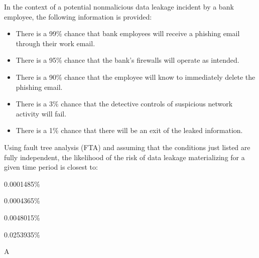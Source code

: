 \documentclass{article}
\newcounter{question} %
\begin{document}
\begin{question}
    In the context of a potential nonmalicious data leakage incident by a bank employee, the following information is provided:
    \begin{itemize}
        \item There is a 99\% chance that bank employees will receive a phishing email through their work email.
        \item There is a 95\% chance that the bank's firewalls will operate as intended.
        \item There is a 90\% chance that the employee will know to immediately delete the phishing email.
        \item There is a 3\% chance that the detective controls of suspicious network activity will fail.
        \item There is a 1\% chance that there will be an exit of the leaked information.
    \end{itemize}
    Using fault tree analysis (FTA) and assuming that the conditions just listed are fully independent, the likelihood of the risk of data leakage materializing for a given time period is closest to:
\end{question}

\begin{choices}
    \item 0.0001485\%
    \item 0.0004365\%
    \item 0.0048015\%
    \item 0.0253935\%
\end{choices}

\begin{correctanswer}
    A
\end{correctanswer}
\end{document}
